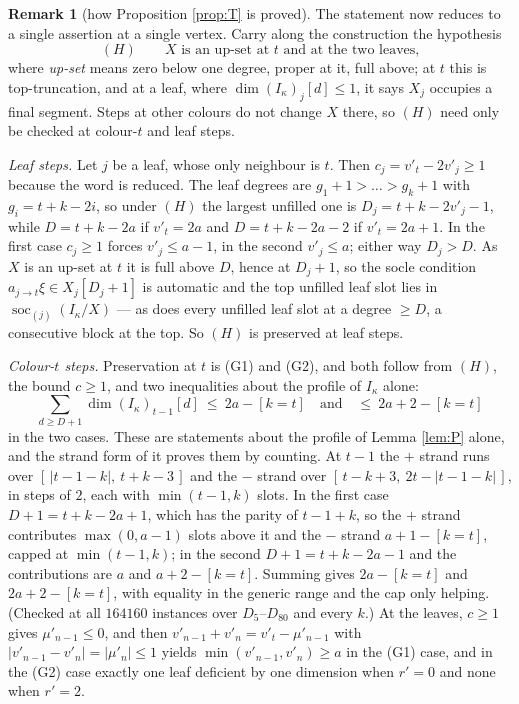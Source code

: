 \documentclass[11pt,reqno]{amsart}
\theoremstyle{plain}
\theoremstyle{definition}
\newtheorem{remark}[theorem]{Remark}
\DeclareMathOperator{\soc}{soc}
\newcommand{\ka}{\kappa}
\begin{document}
\begin{remark}[how Proposition \ref{prop:T} is proved]
The statement now reduces to a single assertion at a single vertex.  Carry
along the construction the hypothesis
\[
   (H)\qquad X \text{ is an up-set at } t \text{ and at the two leaves,}
\]
where \emph{up-set} means zero below one degree, proper at it, full above; at
$t$ this is top-truncation, and at a leaf, where $\dim (I_\ka)_j[d]\le1$, it
says $X_j$ occupies a final segment.  Steps at other colours do not change $X$
there, so $(H)$ need only be checked at colour-$t$ and leaf steps.

\emph{Leaf steps.}  Let $j$ be a leaf, whose only neighbour is $t$.  Then
$c_j=v'_t-2v'_j\ge1$ because the word is reduced.  The leaf degrees are
$g_1+1>\dots>g_k+1$ with $g_i=t+k-2i$, so under $(H)$ the largest unfilled one
is $D_j=t+k-2v'_j-1$, while $D=t+k-2a$ if $v'_t=2a$ and $D=t+k-2a-2$ if
$v'_t=2a+1$.  In the first case $c_j\ge1$ forces $v'_j\le a-1$, in the second
$v'_j\le a$; either way $D_j>D$.  As $X$ is an up-set at $t$ it is full above
$D$, hence at $D_j+1$, so the socle condition
$a_{j\to t}\xi\in X_j[D_j+1]$ is automatic and the top unfilled leaf slot lies
in $\soc_{(j)}(I_\ka/X)$ --- as does every unfilled leaf slot at a degree
$\ge D$, a consecutive block at the top.  So $(H)$ is preserved at leaf steps.

\emph{Colour-$t$ steps.}  Preservation at $t$ is (G1) and (G2), and both follow
from $(H)$, the bound $c\ge1$, and two inequalities about the profile of
$I_\ka$ alone:
\[
   \sum_{d\ge D+1}\dim (I_\ka)_{t-1}[d]\ \le\ 2a-[k=t]
   \quad\text{and}\quad
   \le\ 2a+2-[k=t]
\]
in the two cases.  These are statements about the profile of Lemma \ref{lem:P}
alone, and the strand form of it proves them by counting.  At $t-1$ the $+$
strand runs over $[\,|t-1-k|,\ t+k-3\,]$ and the $-$ strand over
$[\,t-k+3,\ 2t-|t-1-k|\,]$, in steps of $2$, each with $\min(t-1,k)$ slots.  In
the first case $D+1=t+k-2a+1$, which has the parity of $t-1+k$, so the $+$
strand contributes $\max(0,a-1)$ slots above it and the $-$ strand
$a+1-[k=t]$, capped at $\min(t-1,k)$; in the second $D+1=t+k-2a-1$ and the
contributions are $a$ and $a+2-[k=t]$.  Summing gives $2a-[k=t]$ and
$2a+2-[k=t]$, with equality in the generic range and the cap only helping.
(Checked at all $164160$ instances over $D_5$--$D_{80}$ and every $k$.)  At the leaves, $c\ge1$ gives
$\mu'_{n-1}\le0$, and then
$v'_{n-1}+v'_n=v'_t-\mu'_{n-1}$ with $|v'_{n-1}-v'_n|=|\mu'_n|\le1$ yields
$\min(v'_{n-1},v'_n)\ge a$ in the (G1) case, and in the (G2) case exactly one
leaf deficient by one dimension when $r'=0$ and none when $r'=2$.


\end{remark}
\end{document}
